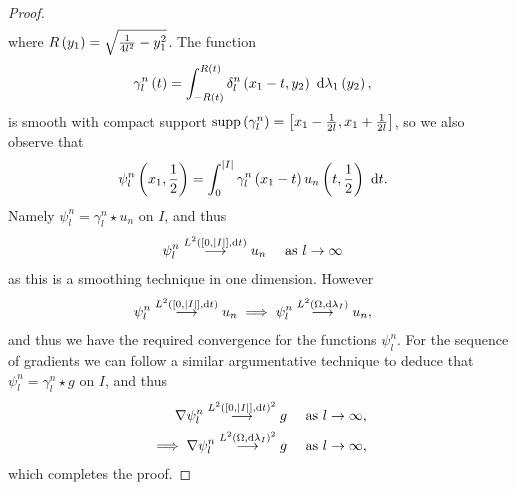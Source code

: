 \documentclass[11pt]{report}
\theoremstyle{plain}
\begin{document}
\begin{proof}
\begin{align*}
	\end{align*}
	where $R\left( y_1 \right) = \sqrt{\frac{1}{4l^2}-y_1^2}$.
	The function
	\begin{align*}
		\gamma_l^n\left( t \right) &= \int_{-R\left( t \right)}^{R\left( t \right)} \delta_l^n\left( x_1-t,y_2 \right) \ \mathrm{d}\lambda_1\left( y_2 \right),
	\end{align*}
	is smooth with compact support $\mathrm{supp}\left( \gamma_l^n \right) = \left[ x_1-\frac{1}{2l}, x_1+\frac{1}{2l} \right]$, so we also observe that
	\begin{align*}
		\psi_l^n\left( x_1,\frac{1}{2} \right) &= \int_0^{\left\lvert I \right\rvert} \gamma_l^n\left( x_1-t \right)u_n\left( t,\frac{1}{2} \right) \ \mathrm{d} t.
	\end{align*}
	Namely $\psi_l^n = \gamma_l^n \star u_n$ on $I$, and thus
	\begin{align*}
		\psi_l^n \overset{L^{2}\left( \left[ 0,\left\lvert I \right\rvert \right],\mathrm{d}t \right)}{\longrightarrow} u_n &\quad \ \text{as} \ l \rightarrow\infty
	\end{align*}
	as this is a smoothing technique in one dimension.
	However 
	\begin{align*}
		\psi_l^n \overset{L^{2}\left( \left[ 0,\left\lvert I \right\rvert \right],\mathrm{d}t \right)}{\longrightarrow} u_n &\implies \psi_l^n \overset{L^{2}\left( \Omega,\mathrm{d}\lambda_I \right)}{\longrightarrow} u_n,
	\end{align*}
	and thus we have the required convergence for the functions $\psi_l^n$.
	For the sequence of gradients we can follow a similar argumentative technique to deduce that $\psi_l^n = \gamma_l^n \star g$ on $I$, and thus
	\begin{align*}
		\nabla\psi_l^n \overset{L^{2}\left( \left[ 0,\left\lvert I \right\rvert \right],\mathrm{d}t \right)^2}{\longrightarrow} g &\quad \ \text{as} \ l \rightarrow\infty, \\
		\implies \nabla\psi_l^n \overset{L^{2}\left( \Omega,\mathrm{d}\lambda_I \right)^2}{\longrightarrow} g &\quad \ \text{as} \ l \rightarrow\infty,
	\end{align*}
	which completes the proof.
\end{proof}
\end{document}
